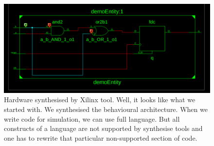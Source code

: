 \documentclass[a4paper,10pt]{article}
\begin{document}
  \begin{figure}[h] \centering
    \includegraphics[width=\textwidth]{./../GHDLDemo/Xilinx/bhav.png}
    \caption{Hardware synthesised by Xilinx tool. Well, it looks like what we
    started with. We synthesised the behavioural architecture. When we write
    code for simulation, we can use full language. But all constructs of a
    language are not supported by synthesise tools and one has to rewrite that
    particular non-supported section of code.} 
    
    \label{fig:synthesis}

  \end{figure}
\end{document}
